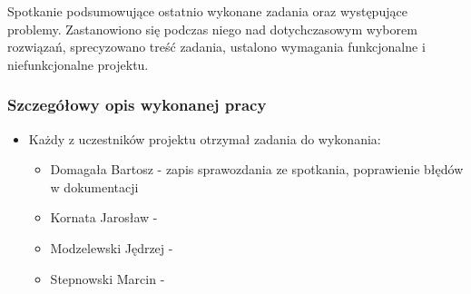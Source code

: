\par{Spotkanie podsumowujące ostatnio wykonane zadania oraz występujące problemy. Zastanowiono się podczas niego nad dotychczasowym wyborem rozwiązań, sprecyzowano treść zadania, ustalono wymagania funkcjonalne i niefunkcjonalne projektu.}


\subsubsection*[Szczegółowy opis wykonanej pracy]{Szczegółowy opis wykonanej pracy}

\begin{itemize}



\item Każdy z uczestników projektu otrzymał zadania do wykonania:
\begin{itemize}
\item Domagała Bartosz - zapis sprawozdania ze spotkania, poprawienie błędów w dokumentacji
\item Kornata Jarosław - 
\item Modzelewski Jędrzej - 
\item Stepnowski Marcin - 
\end{itemize}
\end{itemize}
